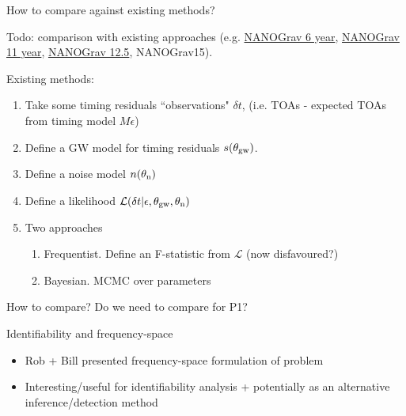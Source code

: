 \documentclass[10pt]{beamer}
\begin{document}
	
			\begin{frame}{How to compare against existing methods?}
		
		
		Todo: comparison with existing approaches (e.g. \href{https://ui.adsabs.harvard.edu/abs/2014ApJ...794..141A/abstract}{NANOGrav 6 year}, \href{https://ui.adsabs.harvard.edu/abs/2019ApJ...880..116A/abstract}{NANOGrav 11 year}, \href{https://ui.adsabs.harvard.edu/abs/2023arXiv230103608A/abstract}{NANOGrav 12.5}, NANOGrav15). 
		
		Existing methods:
		\begin{enumerate}
			\item Take some timing residuals ``observations" $\delta t$, (i.e. TOAs  - expected TOAs from timing model $M \epsilon$)
			\item Define a GW model for timing residuals $s(\theta_{\rm gw})$. 
			\item Define a noise model $n(\theta_{\rm n})$
			\item Define a likelihood $\mathcal{L}(\delta t | \epsilon,\theta_{\rm gw},\theta_{\rm n} )$
			\item Two approaches
			\begin{enumerate}
				\item Frequentist. Define an F-statistic from $\mathcal{L}$ (now disfavoured?)
				\item Bayesian. MCMC over parameters
			\end{enumerate}
			
		\end{enumerate}
		
 How to compare? Do we need to compare for P1? 


	\end{frame}
	
	
	
			\begin{frame}{Identifiability and frequency-space}
		
		
		\begin{itemize}
			\item Rob + Bill presented frequency-space formulation of problem 
			\item Interesting/useful for identifiability analysis + potentially as an alternative inference/detection method
		\end{itemize}
	

		
	\end{frame}
	
	
	\appendix
	
%	
%	
%		
%		
%		
%	
	
	
	
	
\end{document}
